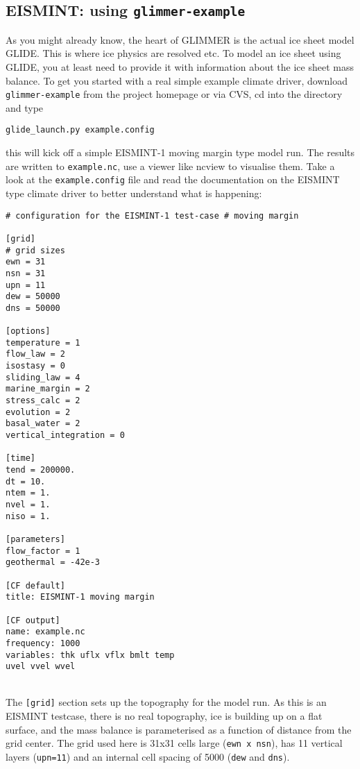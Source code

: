 
\subsection{EISMINT: using \texttt{glimmer-example}}
As you might already know, the heart of GLIMMER is the actual ice sheet model
GLIDE. This is where ice physics are resolved etc. To model an ice sheet using
GLIDE, you at least need to provide it with information about the ice sheet
mass balance. To get you started with a real simple example climate driver,
download \texttt{glimmer-example} from the project homepage or via CVS, cd into
the directory and type
\begin{verbatim}
glide_launch.py example.config
\end{verbatim}
this will kick off a simple EISMINT-1 moving margin type model run. The results
are written to \texttt{example.nc}, use a viewer like ncview to visualise them.
Take a look at the \texttt{example.config} file and read the documentation on
the EISMINT type climate driver to better understand what is happening:\\

\begin{verbatim}
# configuration for the EISMINT-1 test-case # moving margin

[grid]
# grid sizes
ewn = 31
nsn = 31
upn = 11
dew = 50000
dns = 50000

[options]
temperature = 1
flow_law = 2
isostasy = 0
sliding_law = 4
marine_margin = 2
stress_calc = 2
evolution = 2
basal_water = 2
vertical_integration = 0

[time]
tend = 200000.
dt = 10.
ntem = 1.
nvel = 1.
niso = 1.

[parameters]
flow_factor = 1
geothermal = -42e-3

[CF default]
title: EISMINT-1 moving margin

[CF output]
name: example.nc
frequency: 1000
variables: thk uflx vflx bmlt temp
uvel vvel wvel
\end{verbatim}\\

The \texttt{[grid]} section sets up the topography for the model run. As this
is an EISMINT testcase, there is no real topography, ice is building up on a
flat surface, and the mass balance is parameterised as a function of distance
from the grid center. The grid used here is 31x31 cells large (\texttt{ewn x
nsn}), has 11 vertical layers (\texttt{upn=11}) and an internal cell spacing of
5000 (\texttt{dew} and \texttt{dns}).

